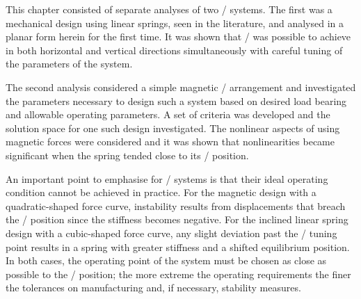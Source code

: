 \documentclass[11pt,a4paper]{memoir}
\begin{document}
This chapter consisted of separate analyses of two \qzs/ systems.
The first was a mechanical design using linear springs, seen in the literature, and analysed in a planar form herein for the first time.
It was shown that \qzs/ was possible to achieve in both horizontal and vertical directions simultaneously with careful tuning of the parameters of the system.

The second analysis considered a simple magnetic \qzs/ arrangement and investigated the parameters necessary to design such a system based on desired load bearing and allowable operating parameters.
A set of criteria was developed and the solution space for one such design investigated.
The nonlinear aspects of using magnetic forces were considered and it was shown that nonlinearities became significant when the spring tended close to its \qzs/ position.

An important point to emphasise for \qzs/ systems is that their ideal operating condition  cannot be achieved in practice.
For the magnetic design with a quadratic-shaped force curve, instability results from displacements that breach the \qzs/ position since the stiffness becomes negative.
For the inclined linear spring design with a cubic-shaped force curve, any slight deviation past the \qzs/ tuning point results in a spring with greater stiffness and a shifted equilibrium position.
In both cases, the operating point of the system must be chosen as close as possible to the \qzs/ position; the more extreme the operating requirements the finer the tolerances on manufacturing and, if necessary, stability measures.
\end{document}
